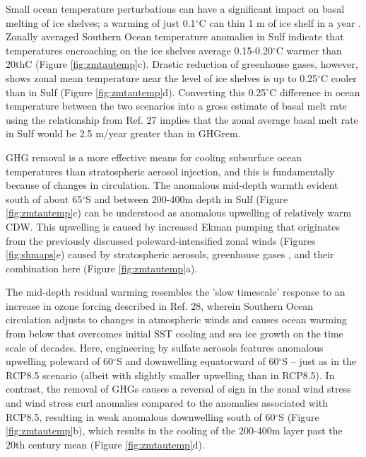 \documentclass{nature}
\begin{document}
Small ocean temperature perturbations can have a significant impact on basal melting of ice shelves; a warming of just 0.1$^\circ$C can thin 1 m of ice shelf in a year \cite{rignot02}. Zonally averaged Southern Ocean temperature anomalies in Sulf indicate that temperatures encroaching on the ice shelves average 0.15-0.20$^\circ$C warmer than 20thC (Figure \ref{fig:zmtautemp}c). Drastic reduction of greenhouse gases, however, shows zonal mean temperature near the level of ice shelves is up to 0.25$^\circ$C cooler than in Sulf (Figure \ref{fig:zmtautemp}d). Converting this 0.25$^\circ$C difference in ocean temperature between the two scenarios into a gross estimate of basal melt rate using the relationship from Ref. 27 implies that the zonal average basal melt rate in Sulf would be 2.5 m/year greater than in GHGrem. %

GHG removal is a more effective means for cooling subsurface ocean temperatures than stratospheric aerosol injection, and this is fundamentally because of changes in circulation. The anomalous mid-depth warmth evident south of about 65$^\circ$S and between 200-400m depth in Sulf (Figure \ref{fig:zmtautemp}c) can be understood as anomalous upwelling of relatively warm CDW. This upwelling is caused by increased Ekman pumping that originates from the previously discussed poleward-intensified zonal winds (Figures \ref{fig:shmaps}e) caused by stratospheric aerosols, greenhouse gases \cite{fyfe07}, and their combination here (Figure \ref{fig:zmtautemp}a). %

The mid-depth residual warming resembles the 'slow timescale' response to an increase in ozone forcing described in Ref. 28, wherein Southern Ocean circulation adjusts to changes in atmospheric winds and causes ocean warming from below that overcomes initial SST cooling and sea ice growth on the time scale of decades. Here, engineering by sulfate aerosols features anomalous upwelling poleward of 60$^\circ$S and downwelling equatorward of 60$^\circ$S -- just as in the RCP8.5 scenario (albeit with slightly smaller upwelling than in RCP8.5). In contrast, the removal of GHGs causes a reversal of sign in the zonal wind stress and wind stress curl anomalies compared to the anomalies associated with RCP8.5, resulting in weak anomalous downwelling south of 60$^\circ$S (Figure \ref{fig:zmtautemp}b), which results in the cooling of the 200-400m layer past the 20th century mean (Figure \ref{fig:zmtautemp}d). 
\end{document}
